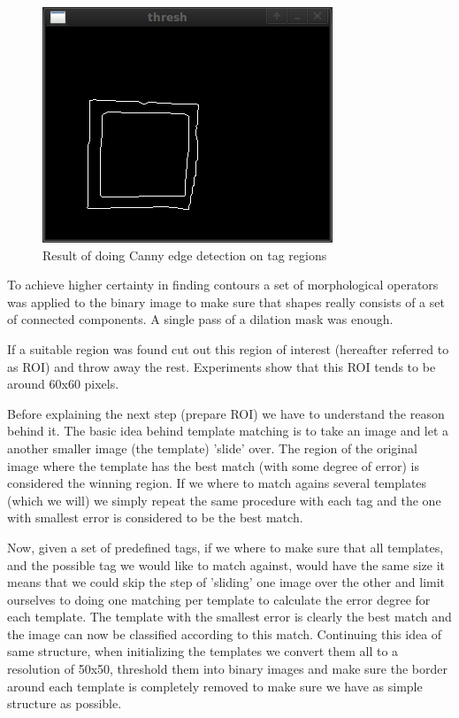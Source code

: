\begin{figure}[h]
\label{fig:canny_edge}
    \begin{centering}
   	 \includegraphics[scale=1.0]{figures/canny.png}
   	 \caption{Result of doing Canny edge detection on tag regions}\label{fig:canny_edge}
    \end{centering}
\end{figure}

To achieve higher certainty in finding contours a set of morphological operators was applied to the binary image to make sure that shapes really consists of a set of connected components. A single pass of a dilation mask was enough.

If a suitable region was found cut out this region of interest (hereafter referred to as ROI) and throw away the rest. Experiments show that this ROI tends to be around 60x60 pixels. 

Before explaining the next step (prepare ROI) we have to understand the reason behind it. The basic idea behind template matching is to take an image and let a another smaller image (the template) 'slide' over. The region of the original image where the template has the best match (with some degree of error) is considered the winning region. If we where to match agains several templates (which we will) we simply repeat the same procedure with each tag and the one with smallest error is considered to be the best match.

Now, given a set of predefined tags, if we where to make sure that all templates, and the possible tag we would like to match against, would have the same size it means that we could skip the step of 'sliding' one image over the other and limit ourselves to doing one matching per template to calculate the error degree for each template. The template with the smallest error is clearly the best match and the image can now be classified according to this match. Continuing this idea of same structure, when initializing the templates we convert them all to a resolution of 50x50, threshold them into binary images and make sure the border around each template is completely removed to make sure we have as simple structure as possible.

